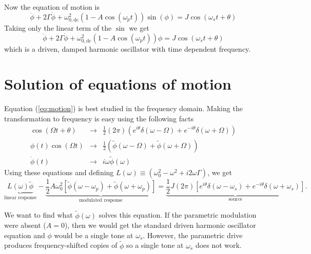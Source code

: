 Now the equation of motion is \begin{equation}
\ddot{\phi} + 2\Gamma \dot{\phi} + \omega_{0,\textrm{dc}}^2(1 - A \cos(\omega_p t))\sin(\phi) = J\cos(\omega_s t + \theta) \end{equation}
Taking only the linear term of the $\sin$ we get \begin{equation}
\ddot{\phi} + 2\Gamma \dot{\phi} + \omega_{0,\textrm{dc}}^2(1 - A \cos(\omega_p t))\phi = J\cos(\omega_s t + \theta) \label{eq:motion} \end{equation}
which is a driven, damped harmonic oscillator with time dependent frequency.

\section{Solution of equations of motion}

Equation (\ref{eq:motion}) is best studied in the frequency domain.
Making the transformation to frequency is easy using the following facts \begin{eqnarray}
\cos(\Omega t + \theta) &\rightarrow& \frac{1}{2}(2\pi)\left(e^{i \theta}\delta(\omega - \Omega) + e^{-i \theta} \delta(\omega + \Omega) \right) \nonumber \\
\phi(t)\cos(\Omega t) &\rightarrow& \frac{1}{2}\left( \tilde{\phi}(\omega-\Omega) + \tilde{\phi}(\omega+\Omega) \right) \nonumber \\
\dot{\phi}(t) &\rightarrow& i\omega \tilde{\phi}(\omega) \nonumber \end{eqnarray}
Using these equations and defining $L(\omega) \equiv (\omega_0^2 - \omega^2 +i2\omega\Gamma)$, we get \begin{equation}
\underbrace{L(\omega) \tilde{\phi}}_{\text{linear response}}
- \underbrace{\frac{1}{2} A \omega_0^2 \left[ \tilde{\phi}(\omega - \omega_p) + \tilde{\phi}(\omega + \omega_p) \right]}_{\text{modulated response}}
= \underbrace{\frac{1}{2}J(2\pi)\left[e^{i \theta}\delta(\omega-\omega_s) + e^{-i\theta}\delta(\omega+\omega_s) \right]}_{\text{source}} . \label{eq:eqOfMotionFrequency} \end{equation}

We want to find what $\tilde{\phi}(\omega)$ solves this equation.
If the parametric modulation were absent ($A=0$), then we would get the standard driven harmonic oscillator equation and $\phi$ would be a single tone at $\omega_s$.
However, the parametric drive produces frequency-shifted copies of $\tilde\phi$ so a single tone at $\omega_s$ does not work.

